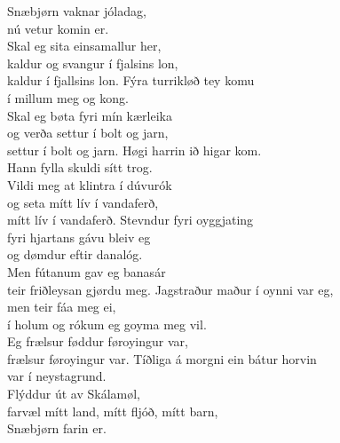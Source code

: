 Snæbjørn vaknar jóladag, \tab{}\\
nú vetur komin er.\tab{}\\
Skal eg sita einsamallur her,\tab{}\\
kaldur og svangur í fjalsins lon,\tab{}\\
kaldur í fjallsins lon.\tab{}
\hops
Fýra turrikløð tey komu\\
í millum meg og kong.\\
Skal eg bøta fyri mín kærleika\\
og verða settur í bolt og jarn,\\
settur í bolt og jarn.
\hops
Høgi harrin ið higar kom.\\
Hann fylla skuldi sítt trog.\\
Vildi meg at klintra í dúvurók\\
og seta mítt lív í vandaferð,\\
mítt lív í vandaferð.
\hops
Stevndur fyri oyggjating\\
fyri hjartans gávu bleiv eg\\
og dømdur eftir danalóg.\\
Men fútanum gav eg banasár\\
teir friðleysan gjørdu meg.
\hops
Jagstraður maður í oynni var eg,\\
men teir fáa meg ei,\\
í holum og rókum eg goyma meg vil.\\
Eg frælsur føddur føroyingur var,\\
frælsur føroyingur var.
\hops
Tíðliga á morgni ein bátur horvin\\
var í neystagrund.\\
Flýddur út av Skálamøl,\\
farvæl mítt land, mítt fljóð, mítt barn,\\
Snæbjørn farin er.

\clearpage
{}

